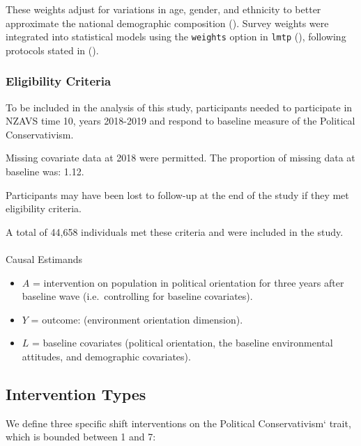 \documentclass[
  single column]{article}
\makeatletter
\let\oldparagraph\paragraph
\renewcommand{\paragraph}{
    \@ifstar
      \xxxParagraphStar
      \xxxParagraphNoStar
  }
\newcommand{\xxxParagraphStar}[1]{\oldparagraph*{#1}\mbox{}}
\newcommand{\xxxParagraphNoStar}[1]{\oldparagraph{#1}\mbox{}}
\providecommand{\tightlist}{%
  \setlength{\itemsep}{0pt}\setlength{\parskip}{0pt}}\usepackage{longtable,booktabs,array}
\makeatother
\begin{document}
These weights adjust for variations in age, gender, and ethnicity to
better approximate the national demographic composition
(). Survey weights were integrated
into statistical models using the \texttt{weights} option in
\texttt{lmtp} (),
following protocols stated in
().

\subsubsection{Eligibility Criteria}\label{eligibility-criteria}

To be included in the analysis of this study, participants needed to
participate in NZAVS time 10, years 2018-2019 and respond to baseline
measure of the Political Conservativism.

Missing covariate data at 2018 were permitted. The proportion of missing
data at baseline was: 1.12.

Participants may have been lost to follow-up at the end of the study if
they met eligibility criteria.

A total of 44,658 individuals met these criteria and were included in
the study.

\paragraph{Causal Estimands}\label{causal-estimands}

\begin{itemize}
\tightlist
\item
  \(A\) = intervention on population in political orientation for three
  years after baseline wave (i.e.~controlling for baseline covariates).
\item
  \(Y\) = outcome: (environment orientation dimension).
\item
  \(L\) = baseline covariates (political orientation, the baseline
  environmental attitudes, and demographic covariates).
\end{itemize}

\subsection{Intervention Types}\label{intervention-types}

We define three specific shift interventions on the Political
Conservativism` trait, which is bounded between 1 and 7:
\end{document}
